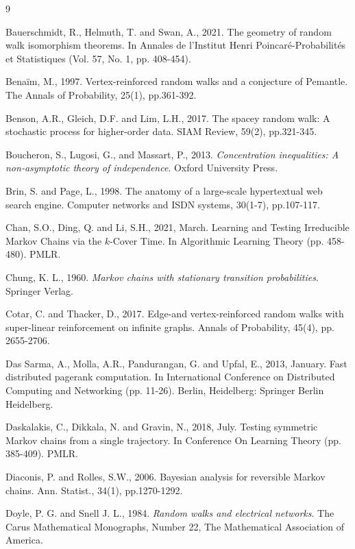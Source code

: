 \documentclass[a4paper, 11pt]{article}
\begin{document}
\begin{thebibliography}{9}

  Bauerschmidt, R., Helmuth, T. and Swan, A., 2021. The geometry of random walk isomorphism theorems. In Annales de l’Institut Henri Poincaré-Probabilités et Statistiques (Vol. 57, No. 1, pp. 408-454).

  Benaïm, M., 1997. Vertex-reinforced random walks and a conjecture of Pemantle. The Annals of Probability, 25(1), pp.361-392.

  Benson, A.R., Gleich, D.F. and Lim, L.H., 2017. The spacey random walk: A stochastic process for higher-order data. SIAM Review, 59(2), pp.321-345.

  Boucheron, S., Lugosi, G., and Massart, P., 2013.
  {\em Concentration inequalities: A non-asymptotic theory of independence}. Oxford University Press.

  Brin, S. and Page, L., 1998. The anatomy of a large-scale hypertextual web search engine. Computer networks and ISDN systems, 30(1-7), pp.107-117.

  Chan, S.O., Ding, Q. and Li, S.H., 2021, March. Learning and Testing Irreducible Markov Chains via the $ k $-Cover Time. In Algorithmic Learning Theory (pp. 458-480). PMLR.

  Chung, K. L., 1960. {\em Markov chains with stationary transition probabilities}. 
  Springer Verlag.

  Cotar, C. and Thacker, D., 2017. Edge-and vertex-reinforced random walks with super-linear reinforcement on infinite graphs. Annals of Probability, 45(4), pp. 2655-2706.

  Das Sarma, A., Molla, A.R., Pandurangan, G. and Upfal, E., 2013, January. Fast distributed pagerank computation. In International Conference on Distributed Computing and Networking (pp. 11-26). Berlin, Heidelberg: Springer Berlin Heidelberg.

  Daskalakis, C., Dikkala, N. and Gravin, N., 2018, July. Testing symmetric Markov chains from a single trajectory. In Conference On Learning Theory (pp. 385-409). PMLR.

  Diaconis, P. and Rolles, S.W., 2006. Bayesian analysis for reversible Markov chains. Ann. Statist., 34(1), pp.1270-1292.

  Doyle, P. G. and Snell J. L., 1984. {\em Random walks and electrical networks}. The Carus Mathematical Monographs, Number 22, The Mathematical Association of America.


\end{thebibliography}
\end{document}
